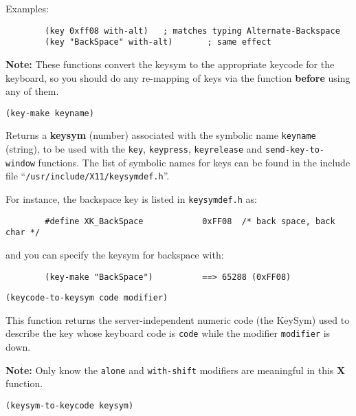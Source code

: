 Examples:{\exemplefont\upspace\begin{verbatim}
        (key 0xff08 with-alt)   ; matches typing Alternate-Backspace
        (key "BackSpace" with-alt)       ; same effect
\end{verbatim}}

{\bf Note:} These functions convert the keysym to the appropriate keycode
for the keyboard, so you should do any re-mapping of keys via the
 function {\bf before} using any of them.


{\usagefont\begin{verbatim}
(key-make keyname)
\end{verbatim}}\usageupspace

Returns a {\bf keysym} (number) associated with the symbolic name
\verb"keyname" (string), to be used with the \verb"key", \verb"keypress",
\verb"keyrelease" and \verb"send-key-to-window" functions. The list of
symbolic names for keys can be found in the include file
``\verb"/usr/include/X11/keysymdef.h"''.

For instance, the backspace key is listed in \verb"keysymdef.h" as:
{\exemplefont\begin{verbatim}
        #define XK_BackSpace            0xFF08  /* back space, back char */
\end{verbatim}}
and you can specify the keysym for backspace with:
{\exemplefont\begin{verbatim}
        (key-make "BackSpace")          ==> 65288 (0xFF08)
\end{verbatim}}


{\usagefont\begin{verbatim}
(keycode-to-keysym code modifier)
\end{verbatim}}\usageupspace

This function returns the server-independent numeric code (the KeySym)
used to describe the key whose keyboard code is \verb"code" while the
modifier \verb"modifier" is down. 

{\bf Note:} Only know the \verb"alone" and \verb"with-shift" modifiers 
are meaningful in this {\bf X} function.


{\usagefont\begin{verbatim}
(keysym-to-keycode keysym)
\end{verbatim}}\usageupspace

